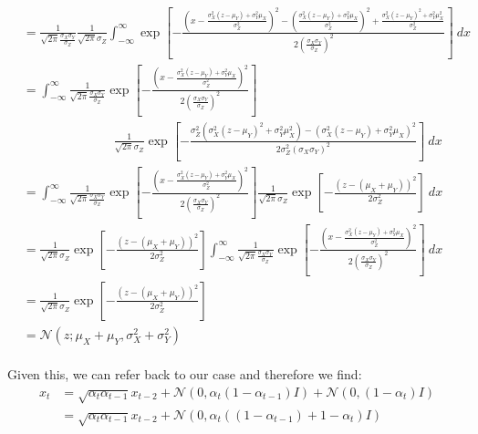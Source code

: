 \documentclass{article}
\begin{document}
{\begin{align*}
  &= \frac{1}{\sqrt{2 \pi} \frac{\sigma_X \sigma_Y}{\sigma_Z}} \frac{1}{\sqrt{2 \pi} \sigma_Z} \int_{-\infty}^{\infty} \exp\left[{-\frac{\left( x - \frac{\sigma_X^2 (z - \mu_Y) + \sigma_Y^2 \mu_X}{\sigma_Z^2}\right)^2 - \left( \frac{\sigma_X^2 (z - \mu_Y) + \sigma_Y^2 \mu_X}{\sigma_Z^2} \right)^2 + \frac{\sigma_X^2 (z - \mu_Y)^2 + \sigma_Y^2 \mu_X^2}{\sigma_Z^2}}{2 \left(\frac{\sigma_X \sigma_Y}{\sigma_Z}\right)^2}} \right] \: dx  \\[10pt]
  &= \int_{-\infty}^{\infty} \frac{1}{\sqrt{2 \pi} \frac{\sigma_X \sigma_Y}{\sigma_Z}} \exp\left[{-\frac{\left( x - \frac{\sigma_X^2 (z - \mu_Y) + \sigma_Y^2 \mu_X}{\sigma_Z^2}\right)^2}{2 \left(\frac{\sigma_X \sigma_Y}{\sigma_Z}\right)^2}} \right] \\[10pt]
  & \hspace{3cm} \frac{1}{\sqrt{2 \pi} \sigma_Z} \exp \left[ - \frac{\sigma_Z^2 \left( \sigma_X^2 (z - \mu_Y)^2 + \sigma_Y^2 \mu_X^2 \right) - \left( \sigma_X^2 (z - \mu_Y) + \sigma_Y^2 \mu_X \right)^2}{2 \sigma_Z^2 (\sigma_X \sigma_Y)^2} \right] \: dx  \\[10pt]
  &= \int_{-\infty}^{\infty} \frac{1}{\sqrt{2 \pi} \frac{\sigma_X \sigma_Y}{\sigma_Z}} \exp\left[{-\frac{\left( x - \frac{\sigma_X^2 (z - \mu_Y) + \sigma_Y^2 \mu_X}{\sigma_Z^2}\right)^2}{2 \left(\frac{\sigma_X \sigma_Y}{\sigma_Z}\right)^2}} \right] \frac{1}{\sqrt{2 \pi} \sigma_Z} \exp \left[ - \frac{(z - (\mu_X + \mu_Y))^2}{2 \sigma_Z^2} \right] \: dx  \\[10pt]
  &= \frac{1}{\sqrt{2 \pi} \sigma_Z} \exp \left[ - \frac{(z - (\mu_X + \mu_Y))^2}{2 \sigma_Z^2} \right] \int_{-\infty}^{\infty} \frac{1}{\sqrt{2 \pi} \frac{\sigma_X \sigma_Y}{\sigma_Z}} \exp\left[{-\frac{\left( x - \frac{\sigma_X^2 (z - \mu_Y) + \sigma_Y^2 \mu_X}{\sigma_Z^2}\right)^2}{2 \left(\frac{\sigma_X \sigma_Y}{\sigma_Z}\right)^2}} \right] \: dx  \\[10pt]
  &= \frac{1}{\sqrt{2 \pi} \sigma_Z} \exp \left[ - \frac{(z - (\mu_X + \mu_Y))^2}{2 \sigma_Z^2} \right] \\[10pt]
  &= \mathcal{N}\left(z; \mu_X + \mu_Y, \sigma_X^2 + \sigma_Y^2 \right)
\end{align*}
}
\\
Given this, we can refer back to our case and therefore we find:
\begin{align*}
  x_t &= \sqrt{\alpha_t \alpha_{t-1}} x_{t-2} + \mathcal{N}\left(0, \alpha_t\left(1 - \alpha_{t-1}\right)I \right) + \mathcal{N}\left(0, (1 - \alpha_t) I \right) \\
  &= \sqrt{\alpha_t \alpha_{t-1}} x_{t-2} + \mathcal{N}\left(0, \alpha_t \left((1 - \alpha_{t-1}) + 1 - \alpha_t \right)I \right) 
\end{align*}

\newpage
\printbibliography
\end{document}

